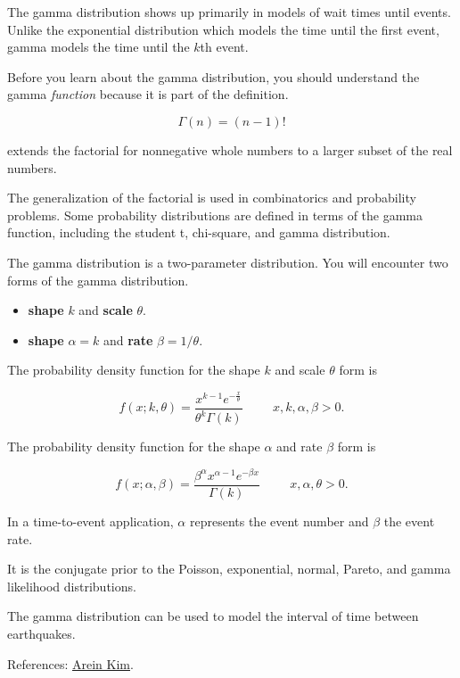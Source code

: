 \documentclass[
]{book}
\providecommand{\tightlist}{%
  \setlength{\itemsep}{0pt}\setlength{\parskip}{0pt}}
\begin{document}
The gamma distribution shows up primarily in models of wait times until events. Unlike the exponential distribution which models the time until the first event, gamma models the time until the \(k\)th event.

Before you learn about the gamma distribution, you should understand the gamma \emph{function} because it is part of the definition.

\[\Gamma(n) = (n-1)!\]

extends the factorial for nonnegative whole numbers to a larger subset of the real numbers.

The generalization of the factorial is used in combinatorics and probability problems. Some probability distributions are defined in terms of the gamma function, including the student t, chi-square, and gamma distribution.

The gamma distribution is a two-parameter distribution. You will encounter two forms of the gamma distribution.

\begin{itemize}
\tightlist
\item
  \textbf{shape} \(k\) and \textbf{scale} \(\theta\).
\item
  \textbf{shape} \(\alpha = k\) and \textbf{rate} \(\beta = 1/\theta\).
\end{itemize}

The probability density function for the shape \(k\) and scale \(\theta\) form is

\[f(x; k, \theta) = \frac{x^{k-1} e^{-\frac{x}{\theta}}}{\theta^k \Gamma(k)} \hspace{1cm} x, k, \alpha, \beta > 0.\]

The probability density function for the shape \(\alpha\) and rate \(\beta\) form is

\[f(x; \alpha, \beta) = \frac{\beta^\alpha x^{\alpha-1}e^{-\beta x}}{\Gamma(k)} \hspace{1cm} x, \alpha, \theta > 0.\]

In a time-to-event application, \(\alpha\) represents the event number and \(\beta\) the event rate.

It is the conjugate prior to the Poisson, exponential, normal, Pareto, and gamma likelihood distributions.

The gamma distribution can be used to model the interval of time between earthquakes.

References: \href{https://towardsdatascience.com/gamma-distribution-intuition-derivation-and-examples-55f407423840}{Arein Kim}.
\end{document}
